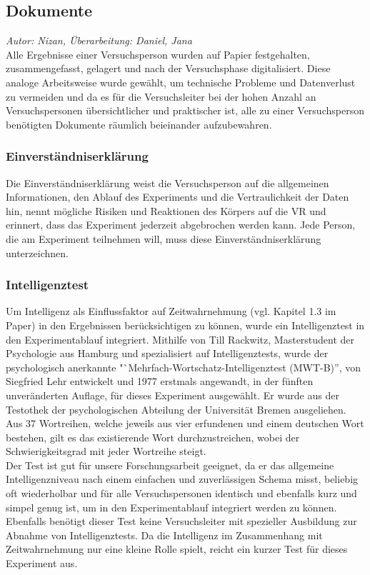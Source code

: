 \documentclass{Bericht}
\begin{document}
\label{subsec:dokumente}
\subsection{Dokumente}
\textit{Autor: Nizan, Überarbeitung: Daniel, Jana}\\
Alle Ergebnisse einer Versuchsperson wurden auf Papier festgehalten, zusammengefasst, gelagert und nach der Versuchsphase digitalisiert. Diese analoge Arbeitsweise wurde gewählt, um technische Probleme und Datenverlust zu vermeiden und da es für die Versuchsleiter bei der hohen Anzahl an Versuchspersonen übersichtlicher und praktischer ist, alle zu einer Versuchsperson benötigten Dokumente räumlich beieinander aufzubewahren.

\subsubsection{Einverständniserklärung}
Die Einverständniserklärung weist die Versuchsperson auf die allgemeinen Informationen, den Ablauf des Experiments und die Vertraulichkeit der Daten hin, nennt mögliche Risiken und Reaktionen des Körpers auf die VR und erinnert, dass das Experiment jederzeit abgebrochen werden kann. Jede Person, die am Experiment teilnehmen will, muss diese Einverständniserklärung unterzeichnen.

\subsubsection{Intelligenztest}
Um Intelligenz als Einflussfaktor auf Zeitwahrnehmung (vgl. Kapitel 1.3 im Paper) in den Ergebnissen berücksichtigen zu können, wurde ein Intelligenztest in den Experimentablauf integriert.
Mithilfe von Till Rackwitz, Masterstudent der Psychologie aus Hamburg und spezialisiert auf Intelligenztests, wurde der psychologisch anerkannte "`Mehrfach-Wortschatz-Intelligenztest (MWT-B)'', von Siegfried Lehr entwickelt und 1977 erstmals angewandt, in der fünften unveränderten Auflage, für dieses Experiment ausgewählt. Er wurde aus der Testothek der psychologischen Abteilung der Universität Bremen ausgeliehen.\\
Aus 37 Wortreihen, welche jeweils aus vier erfundenen und einem deutschen Wort bestehen, gilt es das existierende Wort durchzustreichen, wobei der Schwierigkeitsgrad mit jeder Wortreihe steigt.\\
Der Test ist gut für unsere Forschungsarbeit geeignet, da er das allgemeine Intelligenzniveau nach einem einfachen und zuverlässigen Schema misst, beliebig oft wiederholbar und für alle Versuchspersonen identisch und ebenfalls kurz und simpel genug ist, um in den Experimentablauf integriert werden zu können. Ebenfalls benötigt dieser Test keine Versuchsleiter mit spezieller Ausbildung zur Abnahme von Intelligenztests. 
Da die Intelligenz im Zusammenhang mit Zeitwahrnehmung nur eine kleine Rolle spielt, reicht ein kurzer Test für dieses Experiment aus. 
\end{document}

